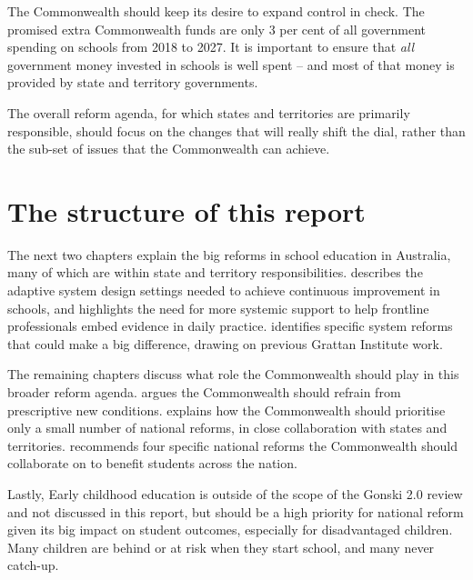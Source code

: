 The Commonwealth should keep its desire to expand control in check. The promised extra Commonwealth funds are only 3 per cent of all government spending on schools from 2018 to 2027. It is important to ensure that \textit{all} government money invested in schools is well spent – and most of that money is provided by state and territory governments.

The overall reform agenda, for which states and territories are primarily responsible, should focus on the changes that will really shift the dial, rather than the sub-set of issues that the Commonwealth can achieve.

\section{The structure of this report}\label{sec:The-big-national-conversation}

The next two chapters explain the big reforms in school education in Australia, many of which are within state and territory responsibilities.  describes the adaptive system design settings needed to achieve continuous improvement in schools, and highlights the need for more systemic support to help frontline professionals embed evidence in daily practice.  identifies specific system reforms that could make a big difference, drawing on previous Grattan Institute work. 

The remaining chapters discuss what role the Commonwealth should play in this broader reform agenda.  argues the Commonwealth should refrain from prescriptive new conditions.  explains how the Commonwealth should prioritise only a small number of national reforms, in close collaboration with states and territories.  recommends four specific national reforms the Commonwealth should collaborate on to benefit students across the nation.

Lastly, Early childhood education is outside of the scope of the Gonski 2.0 review and not discussed in this report, but should be a high priority for national reform given its big impact on student outcomes, especially for disadvantaged children. Many children are behind or at risk when they start school, and many never catch-up. 


